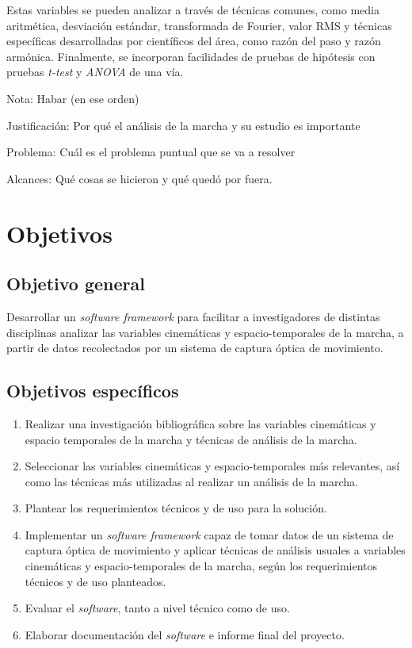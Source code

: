 Estas variables se pueden analizar a través de técnicas comunes, como media aritmética, desviación estándar, transformada de Fourier, valor RMS y técnicas específicas desarrolladas por científicos del área, como razón del paso y razón armónica. Finalmente, se incorporan facilidades de pruebas de hipótesis con pruebas \emph{t-test} y \emph{ANOVA} de una vía. 


Nota: Habar (en ese orden) 

Justificación: Por qué el análisis de la marcha y su estudio es importante

Problema: Cuál es el problema puntual que se va a resolver 

Alcances: Qué cosas se hicieron y qué quedó por fuera. 


\section{Objetivos}

\subsection{Objetivo general}

Desarrollar un \emph{software framework} para facilitar a investigadores de distintas disciplinas analizar las variables cinemáticas y espacio-temporales de la marcha, a partir de datos recolectados por un sistema de captura óptica de movimiento.

\subsection{Objetivos específicos}

\begin{enumerate}
    \item Realizar una investigación bibliográfica sobre las variables cinemáticas y espacio temporales de la marcha y técnicas de análisis de la marcha.
    \item Seleccionar las variables cinemáticas y espacio-temporales más relevantes, así como las técnicas más utilizadas al realizar un análisis de la marcha. 
    \item Plantear los requerimientos técnicos y de uso para la solución. 
    \item Implementar un \emph{software framework} capaz de tomar datos de un sistema de captura óptica de movimiento y aplicar técnicas de análisis usuales a variables cinemáticas y espacio-temporales de la marcha, según los requerimientos técnicos y de uso planteados.
    \item Evaluar el \emph{software}, tanto a nivel técnico como de uso.
    \item Elaborar documentación del \emph{software} e informe final del proyecto.
\end{enumerate}

